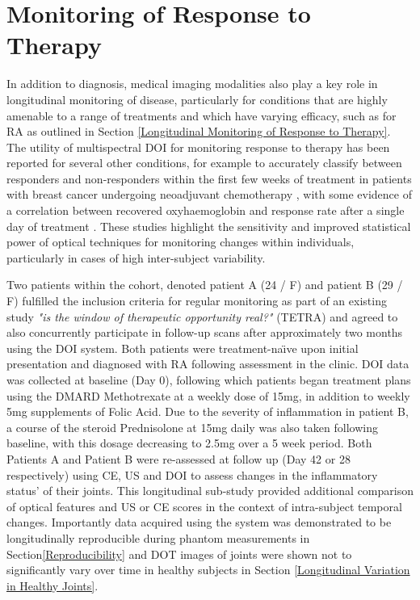 \documentclass[twoside]{bhamthesis}
\theoremstyle{definition}
\begin{document}

\section{Monitoring of Response to Therapy}
\label{Monitoring of Response to Therapy}

In addition to diagnosis, medical imaging modalities also play a key role in longitudinal monitoring of disease, particularly for conditions that are highly amenable to a range of treatments and which have varying efficacy, such as for RA as outlined in Section \ref{Longitudinal Monitoring of Response to Therapy}. The utility of multispectral DOI for monitoring response to therapy has been reported for several other conditions, for example to accurately classify between responders and non-responders within the first few weeks of treatment in patients with breast cancer undergoing neoadjuvant chemotherapy  \cite{soliman2010functional,cerussi2007predicting,cochran2018tissue}, with some evidence of a correlation between recovered oxyhaemoglobin and response rate after a single day of treatment \cite{roblyer2011optical}. These studies highlight the sensitivity and improved statistical power of optical techniques for monitoring changes within individuals, particularly in cases of high inter-subject variability.

Two patients within the cohort, denoted patient A (24 / F) and patient B (29 / F) fulfilled the inclusion criteria for regular monitoring as part of an existing study \textit{"is the window of therapeutic opportunity real?"} (TETRA) and agreed to also concurrently participate in follow-up scans after approximately two months using the DOI system. Both patients were treatment-na\"{\i}ve upon initial presentation and diagnosed with RA following assessment in the clinic. DOI data was collected at baseline (Day 0), following which patients began treatment plans using the DMARD Methotrexate at a weekly dose of 15mg, in addition to weekly 5mg supplements of Folic Acid. Due to the severity of inflammation in patient B, a course of the steroid Prednisolone at 15mg daily was also taken following baseline, with this dosage decreasing to 2.5mg over a 5 week period. Both Patients A and Patient B were re-assessed at follow up (Day 42 or 28 respectively) using CE, US and DOI to assess changes in the inflammatory status' of their joints. This longitudinal sub-study provided additional comparison of optical features and US or CE scores in the context of intra-subject temporal changes. Importantly data acquired using the system was demonstrated to be longitudinally reproducible during phantom measurements in Section\ref{Reproducibility} and DOT images of joints were shown not to significantly vary over time in healthy subjects in Section \ref{Longitudinal Variation in Healthy Joints}.
\end{document}
